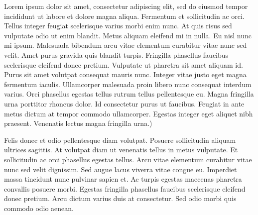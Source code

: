\documentclass[10pt]{article} %
\newenvironment{BoxedInternal}[1][]
{%
  \begin{changemargin}{0cm}{0cm}%
    \begin{mdframed}[roundcorner=5pt,backgroundcolor=swred,outermargin  =-0.5in,innermargin =-0.5in, topline=false, bottomline=false, rightline=false, leftline=false,#1]
    }{%
    \end{mdframed}%
  \end{changemargin}%
}
\newcommand*{\noind}{\setlength{\parindent}{0cm}} %
\newcommand{\bighdr}[2][]{%
  \vspace{2pt}
  \begin{BoxedInternal}[#1]{}
    \color{white}\huge\bfseries\headingfont\filcenter{#2}
  \end{BoxedInternal}\vspace{-8pt}%
}
\begin{document}
\begin{multicols}{2} %
  {\noind %
    Lorem ipsum dolor sit amet, consectetur adipiscing elit, sed do eiusmod tempor incididunt ut labore et dolore magna aliqua. Fermentum et sollicitudin ac orci. Tellus integer feugiat scelerisque varius morbi enim nunc. At quis risus sed vulputate odio ut enim blandit. Metus aliquam eleifend mi in nulla. Eu nisl nunc mi ipsum. Malesuada bibendum arcu vitae elementum curabitur vitae nunc sed velit. Amet purus gravida quis blandit turpis. Fringilla phasellus faucibus scelerisque eleifend donec pretium. Vulputate ut pharetra sit amet aliquam id. Purus sit amet volutpat consequat mauris nunc. Integer vitae justo eget magna fermentum iaculis. Ullamcorper malesuada proin libero nunc consequat interdum varius. Orci phasellus egestas tellus rutrum tellus pellentesque eu. Magna fringilla urna porttitor rhoncus dolor. Id consectetur purus ut faucibus. Feugiat in ante metus dictum at tempor commodo ullamcorper. Egestas integer eget aliquet nibh praesent. Venenatis lectus magna fringilla urna.)
  } %

  \bighdr{INTRODUCTION} %
  {\noind
    Felis donec et odio pellentesque diam volutpat. Posuere sollicitudin aliquam ultrices sagittis. At volutpat diam ut venenatis tellus in metus vulputate. Et sollicitudin ac orci phasellus egestas tellus. Arcu vitae elementum curabitur vitae nunc sed velit dignissim. Sed augue lacus viverra vitae congue eu. Imperdiet massa tincidunt nunc pulvinar sapien et. Ac turpis egestas maecenas pharetra convallis posuere morbi. Egestas fringilla phasellus faucibus scelerisque eleifend donec pretium. Arcu dictum varius duis at consectetur. Sed odio morbi quis commodo odio aenean.
  }


\end{multicols}
\end{document}
